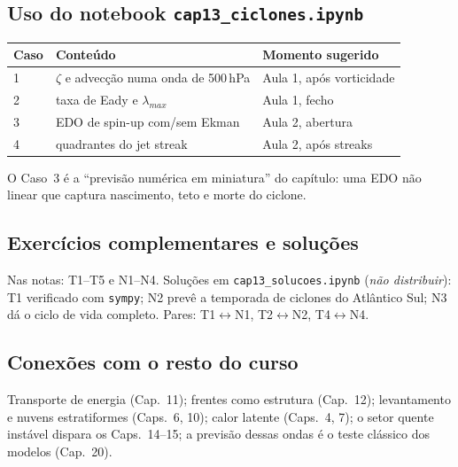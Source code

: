 \subsection*{Uso do notebook \texttt{cap13\_ciclones.ipynb}}

\begin{center}
\begin{tabular}{lll}
\hline
Caso & Conteúdo & Momento sugerido \\
\hline
1 & $\zeta$ e advecção numa onda de 500\,hPa & Aula 1, após vorticidade \\
2 & taxa de Eady e $\lambda_{max}$ & Aula 1, fecho \\
3 & EDO de spin-up com/sem Ekman & Aula 2, abertura \\
4 & quadrantes do jet streak & Aula 2, após streaks \\
\hline
\end{tabular}
\end{center}

O Caso~3 é a ``previsão numérica em miniatura'' do capítulo: uma EDO
não linear que captura nascimento, teto e morte do ciclone.

\subsection*{Exercícios complementares e soluções}

Nas notas: T1--T5 e N1--N4. Soluções em \texttt{cap13\_solucoes.ipynb}
(\emph{não distribuir}): T1 verificado com \texttt{sympy}; N2 prevê a
temporada de ciclones do Atlântico Sul; N3 dá o ciclo de vida completo.
Pares: T1$\leftrightarrow$N1, T2$\leftrightarrow$N2,
T4$\leftrightarrow$N4.

\subsection*{Conexões com o resto do curso}

Transporte de energia (Cap.~11); frentes como estrutura (Cap.~12);
levantamento e nuvens estratiformes (Caps.~6, 10); calor latente
(Caps.~4, 7); o setor quente instável dispara os Caps.~14--15; a
previsão dessas ondas é o teste clássico dos modelos (Cap.~20).
